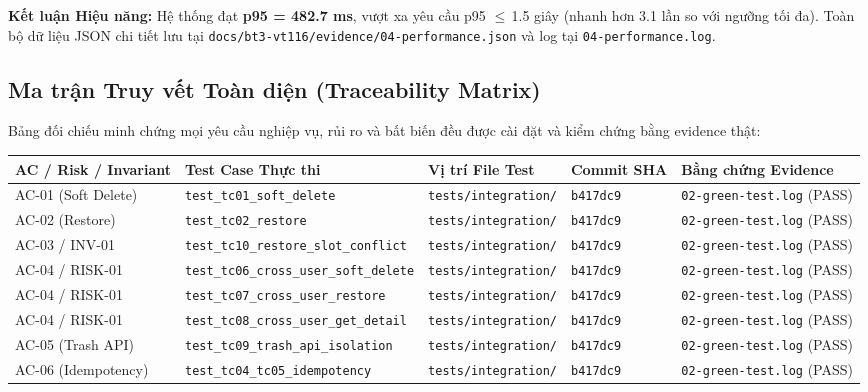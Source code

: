 \documentclass[10pt,a4paper]{article}
\newcommand{\LE}{\ensuremath{\leq}\,}
\newcommand{\hd}[1]{\sffamily\bfseries\scriptsize #1}
\newcommand{\codepath}[1]{{\ttfamily\scriptsize\nolinkurl{#1}}}
\begin{document}
\textbf{Kết luận Hiệu năng:} Hệ thống đạt \textbf{p95 = 482.7 ms}, vượt xa yêu cầu p95 \LE 1.5 giây (nhanh hơn 3.1 lần so với ngưỡng tối đa). Toàn bộ dữ liệu JSON chi tiết lưu tại \codepath{docs/bt3-vt116/evidence/04-performance.json} và log tại \codepath{04-performance.log}.

\subsection{Ma trận Truy vết Toàn diện (Traceability Matrix)}
Bảng đối chiếu minh chứng mọi yêu cầu nghiệp vụ, rủi ro và bất biến đều được cài đặt và kiểm chứng bằng evidence thật:

\vspace{0.6pt}
\scriptsize
\begin{tabularx}{\linewidth}{@{}P{1.8cm}P{3.2cm}P{3.0cm}P{1.6cm}Y@{}}
\toprule
{}\hd{AC / Risk / Invariant} & \hd{Test Case Thực thi} & \hd{Vị trí File Test} & \hd{Commit SHA} & \hd{Bằng chứng Evidence} \\
\midrule
AC-01 (Soft Delete) & \texttt{test\_tc01\_soft\_delete} & \codepath{tests/integration/} & \texttt{b417dc9} & \codepath{02-green-test.log} (PASS) \\
AC-02 (Restore) & \texttt{test\_tc02\_restore} & \codepath{tests/integration/} & \texttt{b417dc9} & \codepath{02-green-test.log} (PASS) \\
AC-03 / INV-01 & \texttt{test\_tc10\_restore\_slot\_conflict} & \codepath{tests/integration/} & \texttt{b417dc9} & \codepath{02-green-test.log} (PASS) \\
AC-04 / RISK-01 & \texttt{test\_tc06\_cross\_user\_soft\_delete} & \codepath{tests/integration/} & \texttt{b417dc9} & \codepath{02-green-test.log} (PASS) \\
AC-04 / RISK-01 & \texttt{test\_tc07\_cross\_user\_restore} & \codepath{tests/integration/} & \texttt{b417dc9} & \codepath{02-green-test.log} (PASS) \\
AC-04 / RISK-01 & \texttt{test\_tc08\_cross\_user\_get\_detail} & \codepath{tests/integration/} & \texttt{b417dc9} & \codepath{02-green-test.log} (PASS) \\
AC-05 (Trash API) & \texttt{test\_tc09\_trash\_api\_isolation} & \codepath{tests/integration/} & \texttt{b417dc9} & \codepath{02-green-test.log} (PASS) \\
AC-06 (Idempotency) & \texttt{test\_tc04\_tc05\_idempotency} & \codepath{tests/integration/} & \texttt{b417dc9} & \codepath{02-green-test.log} (PASS) \\

\end{tabularx}
\end{document}
